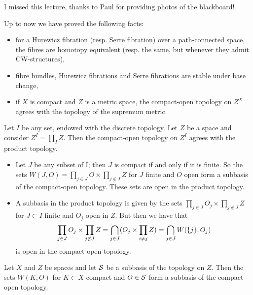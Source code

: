 

I missed this lecture, thanks to Paul for providing photos of the blackboard!

Up to now we have proved the following facts:
\begin{itemize}[label={-}]
    \item for a Hurewicz fibration (resp. Serre fibration) over a path-connected space, the fibres are homotopy equivalent (resp. the same, but whenever they admit CW-structures),
    \item fibre bundles, Hurewicz fibrations and Serre fibrations are stable under base change,
    \item if $X$ is compact and $Z$ is a metric space, the compact-open topology on $Z^X$ agrees with the topology of the supremum metric.
\end{itemize}

\begin{example}
Let $I$ be any set, endowed with the discrete topology. Let $Z$ be a space and consider $Z^I=\prod_I Z$. Then the compact-open topology on $Z^I$ agrees with the product topology.
\begin{itemize}
    \item Let $J$ be any subset of I; then $J$ is compact if and only if it is finite. So the sets $W(J,O)=\prod_{j\in J}O\times\prod_{j\not\in J}Z$ for $J$ finite and $O$ open form a subbasis of the compact-open topology. These sets are open in the product topology.
    \item A subbasis in the product topology is given by the sets $\prod_{j\in J}O_j\times\prod_{j\not\in J}Z$ for $J\subset I$ finite and $O_j$ open in $Z$. But then we have that
    \[\prod_{j\in J}O_j\times\prod_{j\not\in J}Z=\bigcap_{j\in J}(O_j\times\prod_{i\neq j}Z)=\bigcap_{j\in J}W(\cb{j},O_j)\]
    is open in the compact-open topology.
\end{itemize}
\end{example}

\begin{theorem}\label{theorem:compact-subbasis-topology}
Let $X$ and $Z$ be spaces and let $\S$ be a subbasis of the topology on $Z$. Then the sets $W(K,O)$ for $K\subset X$ compact and $O\in\S$ form a subbasis of the compact-open topology.
\end{theorem}

